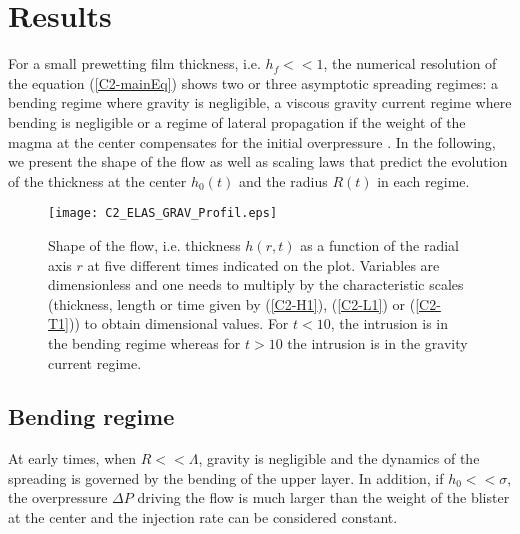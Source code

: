 \section{Results}
\label{C2-sec:regime-propagations}

For a small  prewetting film thickness, i.e.   $h_f<<1$, the numerical
resolution  of  the  equation  (\ref{C2-mainEq}) shows  two  or  three
asymptotic  spreading  regimes:  a  bending regime  where  gravity  is
negligible,  a  viscous  gravity   current  regime  where  bending  is
negligible or  a regime of  lateral propagation  if the weight  of the
magma  at   the  center  compensates  for   the  initial  overpressure
\citep{Michaut:2011kg,Bunger:2011cb,Lister:2013ia}. In  the following,
we present the shape of the flow  as well as scaling laws that predict
the evolution of  the thickness at the center $h_0(t)$  and the radius
$R(t)$ in each regime.

\begin{figure}[h!]
  \begin{center}
    \graphicspath{ {/Users/thorey/Documents/These/Manuscript/Figure/Chapter2/} }
    \texttt{[image: C2\_ELAS\_GRAV\_Profil.eps]}
    \caption{Shape of the flow, i.e.  thickness $h(r,t)$ as a function
      of the radial axis $r$ at  five different times indicated on the
      plot. Variables are  dimensionless and one needs  to multiply by
      the characteristic  scales (thickness,  length or time  given by
      (\ref{C2-H1}),   (\ref{C2-L1})  or   (\ref{C2-T1}))  to   obtain
      dimensional values.  For $t<10$, the intrusion is in the bending
      regime  whereas  for $t>10$  the  intrusion  is in  the  gravity
      current regime.}
    \label{C2_ELAS_GRAV_Profil}
  \end{center}
\end{figure}

\subsection{Bending regime}
\label{C2-sec:bending-regime}

At  early times,  when  $R<<\Lambda$, gravity  is  negligible and  the
dynamics of  the spreading  is governed  by the  bending of  the upper
layer.   In addition,  if $h_0<<\sigma$,  the overpressure  $\Delta P$
driving the flow is much larger than  the weight of the blister at the
center and the injection rate can be considered constant.

